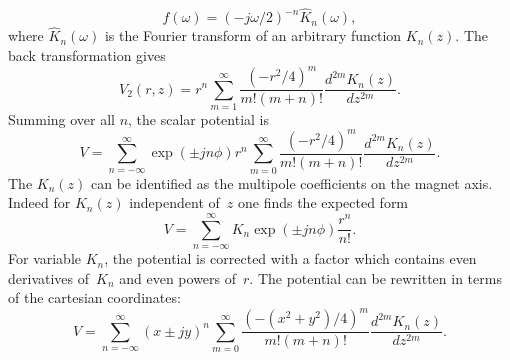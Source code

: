 \documentclass{report}
\begin{document}
\begin{equation}
  \hat{f}(\omega) = (- j\omega / 2)^{-n} \hat{K}_n(\omega),
\end{equation}
where $\hat{K}_n(\omega)$ is the Fourier transform of an arbitrary
function $K_n(z)$.
The back transformation gives
\begin{equation}
  V_2(r,z) = r^n \sum_{m=1}^\infty \frac{(- r^2 / 4)^m}{m! (m+n)!}
  \frac{d^{2m} K_n(z)}{d z^{2m}}.
\end{equation}
Summing over all $n$, the scalar potential is
\begin{equation}
  V = \sum_{n=-\infty}^\infty \exp(\pm j n \phi) r^n
  \sum_{m=0}^\infty \frac{(- r^2 / 4)^m}{m! (m+n)!}
  \frac{d^{2m} K_n(z)}{d z^{2m}}.
\end{equation}
The $K_n(z)$ can be identified as the multipole coefficients on the
magnet axis.
Indeed for $K_n(z)$ independent of~$z$ one finds the expected form
\begin{equation}
  V = \sum_{n=-\infty}^\infty K_n \exp(\pm j n \phi) \frac{r^n}{n!}.
\end{equation}
For variable $K_n$, the potential is corrected with a factor which
contains even derivatives of~$K_n$ and even powers of~$r$.
The potential can be rewritten in terms of the cartesian coordinates:
\begin{equation}
  V = \sum_{n=-\infty}^\infty (x \pm j y)^n 
  \sum_{m=0}^\infty \frac{(-(x^2+y^2)/4)^m}{m! (m+n)!}
  \frac{d^{2m} K_n(z)}{d z^{2m}}.
\end{equation}


\clearpage
\end{document}
